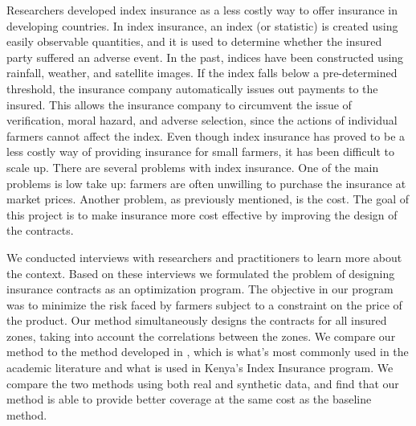 \documentclass[11pt]{article}
\begin{document}
Researchers developed index insurance as a less costly way to offer insurance in developing countries. In index insurance, an index (or statistic) is created using easily observable quantities, and it is used to determine whether the insured party suffered an adverse event. In the past, indices have been constructed using rainfall, weather, and satellite images. If the index falls below a pre-determined threshold, the insurance company automatically issues out payments to the insured. This allows the insurance company to circumvent the issue of verification, moral hazard, and adverse selection, since the actions of individual farmers cannot affect the index. Even though index insurance has proved to be a less costly way of providing insurance for small farmers, it has been difficult to scale up. There are several problems with index insurance. One of the main problems is low take up: farmers are often unwilling to purchase the insurance at market prices. Another problem, as previously mentioned, is the cost. The goal of this project is to make insurance more cost effective by improving the design of the contracts. %

We conducted interviews with researchers and practitioners to learn more about the context. Based on these interviews we formulated the problem of designing insurance contracts as an optimization program. The objective in our program was to minimize the risk faced by farmers subject to a constraint on the price of the product. Our method simultaneously designs the contracts for all insured zones, taking into account the correlations between the zones. We compare our method to the method developed in \cite{chantarat2013designing}, which is what's most commonly used in the academic literature and what is used in Kenya's Index Insurance program. We compare the two methods using both real and synthetic data, and find that our method is able to provide better coverage at the same cost as the baseline method. 
\end{document}
